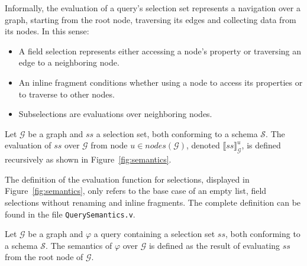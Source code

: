 



Informally, the evaluation of a query's selection set represents a navigation over a graph, starting from the root node, traversing its edges and collecting data from its nodes. In this sense:
\begin{itemize}
    \item A field selection represents either accessing a node's property or traversing an edge to a neighboring node.
    \item An inline fragment conditions whether using a node to access its properties or to traverse to other nodes.
    \item Subselections are evaluations over neighboring nodes.
\end{itemize}

\begin{definition}
Let $\mathcal{G}$ be a graph and $ss$ a selection set, both conforming to a schema $\mathcal{S}$. The evaluation of $ss$ over $\mathcal{G}$ from node $u \in \mathit{nodes}(\mathcal{G})$, denoted $\llbracket ss \rrbracket^{u}_{\mathcal{G}}$, is defined recursively as shown in Figure~\ref{fig:semantics}. 
\end{definition}

The definition of the evaluation function for selections, displayed in Figure~\ref{fig:semantics}, only refers to the base case of an empty list, field selections without renaming and inline fragments. The complete definition can be found in the file \texttt{QuerySemantics.v}.

\begin{definition}
Let $\mathcal{G}$ be a graph and $\varphi$ a query containing a selection set $ss$, both conforming to a schema $\mathcal{S}$. The semantics of $\varphi$ over $\mathcal{G}$ is defined as the result of evaluating $ss$ from the root node of $\mathcal{G}$.
\end{definition}


